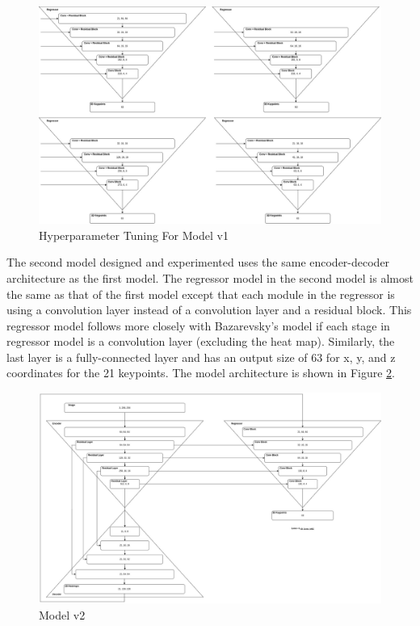 \begin{figure}[ht]
	\begin{center}
		\includegraphics[width=450px]{assets/Model_v1.x.jpg}
		\caption{Hyperparameter Tuning For Model v1}
		\label{fig:model_v1_x}
	\end{center}
\end{figure}

\newpage

\noindent
The second model designed and experimented uses the same encoder-decoder architecture as the first model. The regressor model in the second model is almost the same as that of the first model except that each module in the regressor is using a convolution layer instead of a convolution layer and a residual block. This regressor model follows more closely with Bazarevsky's model if each stage in regressor model is a convolution layer (excluding the heat map). Similarly, the last layer is a fully-connected layer and has an output size of 63 for x, y, and z coordinates for the 21 keypoints. The model architecture is shown in Figure \ref{fig:model_v2}.

\begin{figure}[ht]
	\begin{center}
		\includegraphics[width=450px]{assets/Model_v2.jpg}
		\caption{Model v2}
		\label{fig:model_v2}
	\end{center}
\end{figure}

